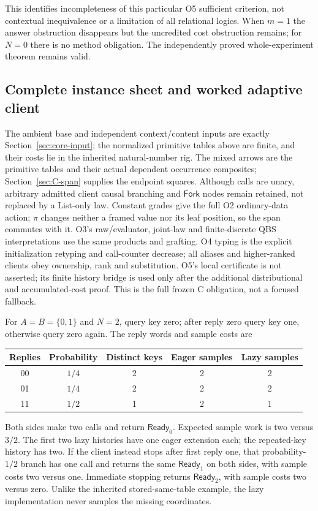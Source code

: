 This identifies incompleteness of this particular O5 sufficient
criterion, not contextual inequivalence or a limitation of all relational
logics. When $m=1$ the answer obstruction disappears but the uncredited
cost obstruction remains; for $N=0$ there is no method obligation.
The independently proved whole-experiment theorem remains valid.

\subsection{Complete instance sheet and worked adaptive client}
The ambient base and independent context/content inputs are exactly
Section~\ref{sec:core-input}; the normalized primitive tables above are
finite, and their costs lie in the inherited natural-number rig.
The mixed arrows are the primitive tables and their actual dependent
occurrence composites; Section~\ref{sec:C-span} supplies the endpoint
squares. Although calls are unary, arbitrary admitted client causal
branching and $\mathsf{Fork}$ nodes remain retained, not replaced by a
List-only law. Constant grades give the full O2 ordinary-data action;
$\pi$ changes neither a framed value nor its leaf position, so the span
commutes with it. O3's raw/evaluator, joint-law and finite-discrete QBS
interpretations use the same products and grafting. O4 typing is the
explicit initialization retyping and call-counter decrease; all aliases
and higher-ranked clients obey ownership, rank and substitution. O5's
local certificate is not asserted; its finite history bridge is used
only after the additional distributional and accumulated-cost proof.
This is the full frozen C obligation, not a focused fallback.

For $A=B=\{0,1\}$ and $N=2$, query key zero; after reply zero query key
one, otherwise query zero again. The reply words and sample costs are
\begin{center}
\begin{tabular}{@{}ccccc@{}}
\toprule Replies&Probability&Distinct keys&Eager samples&Lazy samples\\\midrule
00&$1/4$&2&2&2\\
01&$1/4$&2&2&2\\
11&$1/2$&1&2&1\\
\bottomrule
\end{tabular}
\end{center}
Both sides make two calls and return $\mathsf{Ready}_0$. Expected sample
work is two versus $3/2$. The first two lazy histories have one eager
extension each; the repeated-key history has two. If the client instead
stops after first reply one, that probability-$1/2$ branch has one call
and returns the same $\mathsf{Ready}_1$ on both sides, with sample costs
two versus one. Immediate stopping returns $\mathsf{Ready}_2$, with
sample costs two versus zero. Unlike the inherited stored-same-table
example, the lazy implementation never samples the missing coordinates.

